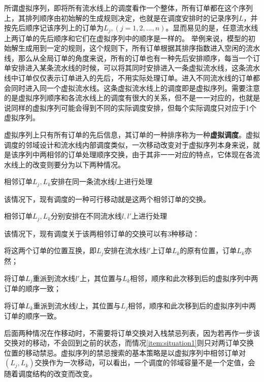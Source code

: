 所谓虚拟序列，即将所有流水线上的调度看作一个整体，所有订单都在这个序列上，其排列顺序由初始解的生成规则决定，也就是在调度安排时的记录序列$L$，并按先后顺序记该序列上的订单为$L_j, (j = 1,2,...,n)$。显而易见的是，任意流水线上两订单的先后顺序和它们在虚拟序列中的顺序是一样的。
举例来说，模型的初始解生成用到一定的规则，这个规则下，所有订单根据其排序指数进入空闲的流水线，那么从全局订单的角度来说，所有的订单也有一种先后安排顺序，每当一个订单安排进入某条流水线的时候，可以将其同时安排进入一条虚拟流水线，这条流水线中订单仅仅表示订单进入的先后，不用实际处理订单。进入不同流水线的订单都会同时进入同一个虚拟流水线。这条虚拟流水线上的调度即是虚拟序列。需要注意的是虚拟序列顺序和各流水线上的调度有很大的关系，但不是一一对应的，也就是说同样的虚拟序列可能会得到不同的实际调度安排，但每个实际调度只对应于1个虚拟序列。

虚拟序列上只有所有订单的先后信息，其订单的一种排序称为一种\textbf{虚拟调度}。虚拟调度的邻域设计和流水线内部调度类似，一次移动改变对于虚拟序列本身来说，就是该序列中两相邻的订单处理顺序交换，由于其非一一对应的特点，它体现在各流水线上的改变则要分为以下两种情况。
\begin{asparaenum}
\item 相邻订单$L_j, L_k$安排在同一条流水线$l$上进行处理

该情况下，现有调度的一种可行移动就是这两个相邻订单的交换。
\item 相邻订单$L_j, L_k$分别安排在不同流水线$l, l'$上进行处理
\end{asparaenum}

该情况下，现有调度关于该两相邻订单的交换可以有$3$种移动：
\begin{inparaenum}
\renewcommand{\labelenumi}{\theenumi)}
\item 将这两个订单的位置互换，即$L_j$安排在流水线$l'$上订单$L_k$的原有位置，订单$L_k$亦然\label{item:situation1}；
\item 将订单$L_j$重派到流水线$l'$上，其位置与$L_k$相邻，顺序和此次移到后的虚拟序列中两订单的顺序一致；
\item 将订单$L_k$重派到流水线$l$上，其位置与$L_j$相邻，顺序和此次移到后的虚拟序列中两订单的顺序一致。
\end{inparaenum}

后面两种情况在作移动时，不需要将订单交换对入栈禁忌列表，因为若再作一步该交换对的移动，不会回到之前的状态，而情况\ref{item:situation1}则只对两订单交换位置的移动禁忌。虚拟序列的禁忌搜索的基本策略是以虚拟序列中相邻订单对$(L_j, L_k)$交换作为一次移动，可以看出，一个调度的邻域容量不是一个定值，会随着调度结构的改变而改变。

